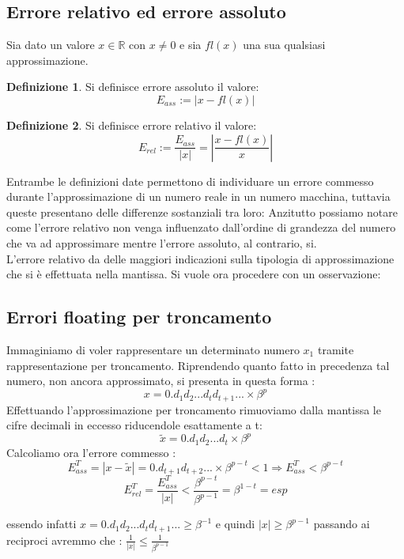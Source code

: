 \documentclass[12pt, a4paper]{book}
\theoremstyle{definition}
\newtheorem{defn}{Definizione}[section]
\begin{document}
\subsection{Errore relativo ed errore assoluto}
\begin{flushleft}
Sia dato un valore $x \in \mathbb{R}$ con $x \neq 0$ e sia $fl(x)$ una sua qualsiasi approssimazione. 
\begin{defn}
Si definisce errore assoluto il valore: \[ E_{ass} := |x - fl(x)| \]
\end{defn}
\begin{defn}
Si definisce errore relativo il valore: \[E_{rel} := \frac{E_{ass}}{|x|} =  \displaystyle\left\lvert \frac{x - fl(x)}{x} \right\rvert\]
\end{defn}
Entrambe le definizioni date permettono di individuare un errore commesso durante l'approssimazione di un numero reale in un numero macchina, tuttavia queste presentano delle differenze sostanziali tra loro: 
Anzitutto possiamo notare come l'errore relativo non venga influenzato dall'ordine di grandezza del numero che va ad approssimare mentre l'errore assoluto, al contrario, si. \\
L'errore relativo da delle maggiori indicazioni sulla tipologia di approssimazione che si è effettuata nella mantissa.  
Si vuole ora procedere con un osservazione:
\end{flushleft}

\subsection{Errori floating per troncamento}
\begin{flushleft}
Immaginiamo di voler rappresentare un determinato numero $x_{1}$  tramite rappresentazione per troncamento. 
Riprendendo quanto fatto in precedenza tal numero, non ancora approssimato,  si presenta in questa forma : 
\[ x = 0.d_{1}d_{2}...d_{t}d_{t+1}... \times \beta^{p} \]
Effettuando l'approssimazione per troncamento rimuoviamo dalla mantissa le cifre decimali in eccesso riducendole esattamente a t:
\[ \widetilde{x} = 0.d_{1}d_{2}...d_{t}\times\beta^{p} \]
Calcoliamo ora l'errore commesso : 
\[ E_{ass}^{T} = |x - \widetilde{x}| =   0.d_{t+1}d_{t+2}...\times\beta^{p-t} < 1 \Longrightarrow  E_{ass}^{T} < \beta^{p-t}  \]
\[ E_{rel}^{T} = \frac{E_{ass}^{T}}{|x|} < \frac{ \beta^{p-t}}{ \beta^{p-1}} =  \beta^{1-t} = esp \]

essendo infatti $x = 0.d_{1}d_{2}...d_{t}d_{t+1}... \geq \beta^{-1}$ e quindi $|x| \geq \beta^{p-1}$ passando ai reciproci avremmo che : $\frac{1}{|x|} \leq \frac{1}{\beta^{p-1}}$
\end{flushleft}
\pagebreak
\end{document}
